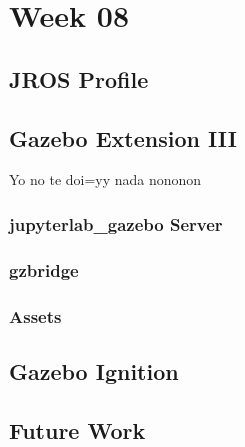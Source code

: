 \chapter{Week 08}

\section{JROS Profile}




\section{Gazebo Extension III}

    Yo no te doi=yy nada nononon

    \subsection{jupyterlab\_gazebo Server}
    
    \subsection{gzbridge}
    
    \subsection{Assets}
    
    
\section{Gazebo Ignition}


\section{Future Work}